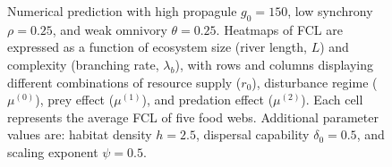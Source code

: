 \begin{figure}
\centering
{}
\caption{Numerical prediction with high propagule \(g_0 = 150\), low
synchrony \(\rho = 0.25\), and weak omnivory \(\theta = 0.25\). Heatmaps
of FCL are expressed as a function of ecosystem size (river length,
\(L\)) and complexity (branching rate, \(\lambda_b\)), with rows and
columns displaying different combinations of resource supply (\(r_0\)),
disturbance regime (\(\mu^{(0)}\)), prey effect (\(\mu^{(1)}\)), and
predation effect (\(\mu^{(2)}\)). Each cell represents the average FCL
of five food webs. Additional parameter values are: habitat density
\(h=2.5\), dispersal capability \(\delta_0=0.5\), and scaling exponent
\(\psi=0.5\).}
\end{figure}

\newpage

